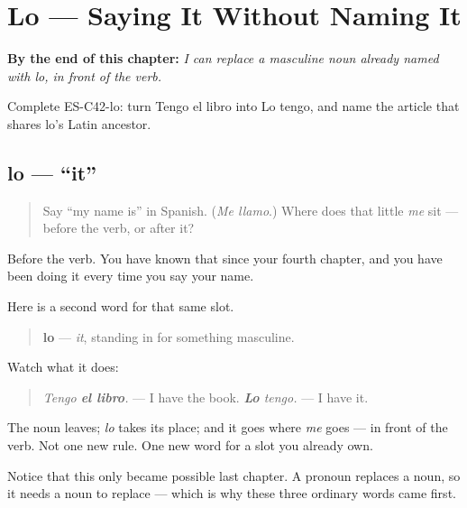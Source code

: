 
\chapter{Lo --- Saying It Without Naming It}
\label{ch:pronoun-lo}

\begin{chapteropening}
\textbf{By the end of this chapter:} \emph{I can replace a masculine noun already named with lo, in front of the verb.}

Complete ES-C42-lo: turn Tengo el libro into Lo tengo, and name the article that shares lo's Latin ancestor.
\end{chapteropening}

\section[lo]{lo — \textquotedblleft{}it\textquotedblright{}}

\label{lesson:ES-C42-lo}



\begin{quote}
Say \textquotedblleft{}my name is\textquotedblright{} in Spanish. (\emph{Me llamo}.) Where does that little \emph{me} sit — before the verb, or after it?
\end{quote}

\begin{grammarlens}[title={Grammar Lens: a slot you have been using all along}]
Before the verb. You have known that since your fourth chapter, and you have been doing it every time you say your name.

Here is a second word for that same slot.

\begin{quote}
\textbf{lo} — \emph{it}, standing in for something masculine.
\end{quote}

Watch what it does:

\begin{quote}
\emph{Tengo \textbf{el libro}.} — I have the book. \emph{\textbf{Lo} tengo.} — I have it.
\end{quote}

The noun leaves; \emph{lo} takes its place; and it goes where \emph{me} goes — in front of the verb. Not one new rule. One new word for a slot you already own.

Notice that this only became possible last chapter. A pronoun replaces a noun, so it needs a noun to replace — which is why these three ordinary words came first.
\end{grammarlens}

